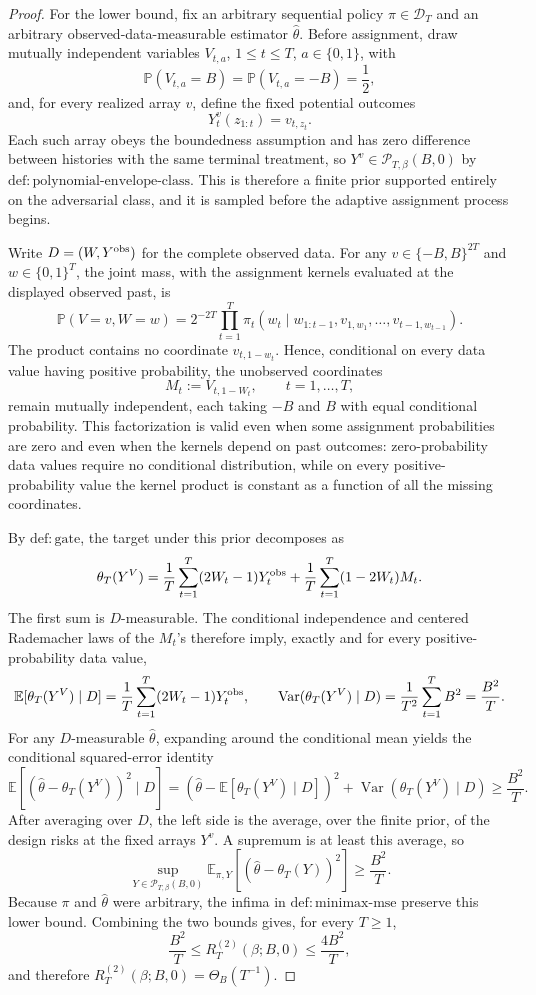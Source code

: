\documentclass{article}
\begin{document}
\begin{proof}
For the lower bound, fix an arbitrary sequential policy \(\pi\in\mathcal D_T\) and an arbitrary observed-data-measurable estimator \(\widehat\theta\).  Before assignment, draw mutually independent variables \(V_{t,a}\), \(1\le t\le T\), \(a\in\{0,1\}\), with
\[
 \mathbb P(V_{t,a}=B)=\mathbb P(V_{t,a}=-B)=\frac12,
\]
and, for every realized array \(v\), define the fixed potential outcomes
\[
 Y_t^v(z_{1:t})=v_{t,z_t}.
\]
Each such array obeys the boundedness assumption and has zero difference between histories with the same terminal treatment, so \(Y^v\in\mathcal P_{T,\beta}(B,0)\) by \(\mathrm{def{:}polynomial\mbox{-}envelope\mbox{-}class}\).  This is therefore a finite prior supported entirely on the adversarial class, and it is sampled before the adaptive assignment process begins.

Write \(D=(W,Y^{\rm obs})\) for the complete observed data.  For any \(v\in\{-B,B\}^{2T}\) and \(w\in\{0,1\}^T\), the joint mass, with the assignment kernels evaluated at the displayed observed past, is
\[
 \mathbb P(V=v,W=w)
 =2^{-2T}\prod_{t=1}^T
 \pi_t\!\left(w_t\mid
 w_{1:t-1},v_{1,w_1},\ldots,v_{t-1,w_{t-1}}\right).
\]
The product contains no coordinate \(v_{t,1-w_t}\).  Hence, conditional on every data value having positive probability, the unobserved coordinates
\[
 M_t:=V_{t,1-W_t},\qquad t=1,\ldots,T,
\]
remain mutually independent, each taking \(-B\) and \(B\) with equal conditional probability.  This factorization is valid even when some assignment probabilities are zero and even when the kernels depend on past outcomes: zero-probability data values require no conditional distribution, while on every positive-probability value the kernel product is constant as a function of all the missing coordinates.

By \(\mathrm{def{:}gate}\), the target under this prior decomposes as
\[
 \theta_T(Y^V)
 =\frac1T\sum_{t=1}^T(2W_t-1)Y_t^{\rm obs}
 +\frac1T\sum_{t=1}^T(1-2W_t)M_t.
\]
The first sum is \(D\)-measurable.  The conditional independence and centered Rademacher laws of the \(M_t\)'s therefore imply, exactly and for every positive-probability data value,
\[
 \mathbb E[\theta_T(Y^V)\mid D]
 =\frac1T\sum_{t=1}^T(2W_t-1)Y_t^{\rm obs},
 \qquad
 \operatorname{Var}(\theta_T(Y^V)\mid D)
 =\frac1{T^2}\sum_{t=1}^T B^2
 =\frac{B^2}{T}.
\]
For any \(D\)-measurable \(\widehat\theta\), expanding around the conditional mean yields the conditional squared-error identity
\[
 \mathbb E\!\left[(\widehat\theta-\theta_T(Y^V))^2\mid D\right]
 =\left(\widehat\theta-\mathbb E[\theta_T(Y^V)\mid D]\right)^2
 +\operatorname{Var}(\theta_T(Y^V)\mid D)
 \ge \frac{B^2}{T}.
\]
After averaging over \(D\), the left side is the average, over the finite prior, of the design risks at the fixed arrays \(Y^v\).  A supremum is at least this average, so
\[
 \sup_{Y\in\mathcal P_{T,\beta}(B,0)}
 \mathbb E_{\pi,Y}[(\widehat\theta-\theta_T(Y))^2]
 \ge \frac{B^2}{T}.
\]
Because \(\pi\) and \(\widehat\theta\) were arbitrary, the infima in \(\mathrm{def{:}minimax\mbox{-}mse}\) preserve this lower bound.  Combining the two bounds gives, for every \(T\ge1\),
\[
 \frac{B^2}{T}\le R_T^{(2)}(\beta;B,0)\le\frac{4B^2}{T},
\]
and therefore \(R_T^{(2)}(\beta;B,0)=\Theta_B(T^{-1})\).
\end{proof}
\end{document}
